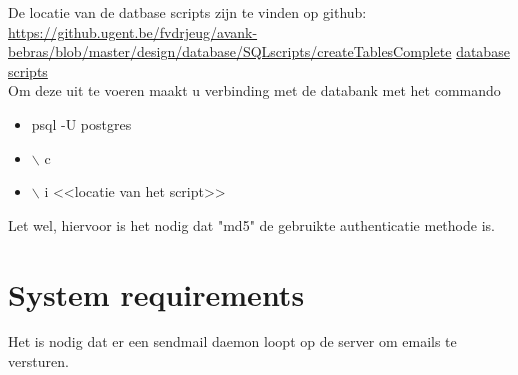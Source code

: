 \documentclass[10pt,a4paper]{article}
\begin{document}
De locatie van de datbase scripts zijn te vinden op github:
\url{https://github.ugent.be/fvdrjeug/avank-bebras/blob/master/design/database/SQLscripts/createTablesComplete}
\href{https://github.ugent.be/fvdrjeug/avank-bebras/blob/master/design/database/SQLscripts/createTablesComplete}{database scripts}\\

Om deze uit te voeren maakt u verbinding met de databank met het commando
\begin{itemize}
\item psql -U postgres
\item $\backslash$ c
\item $\backslash$ i <<locatie van het script>>
\end{itemize} 
Let wel, hiervoor is het nodig dat "md5" de gebruikte authenticatie methode is.

\section*{System requirements}
Het is nodig dat er een sendmail daemon loopt op de server om emails te versturen.
\end{document}
